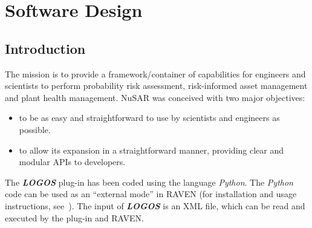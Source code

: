 \section{Software Design}
\subsection{Introduction}
The mission is to provide a framework/container of capabilities for
engineers and scientists to perform probability risk assessment,
risk-informed asset management and plant health management.
NuSAR was conceived with two major objectives:
\begin{itemize}
  \item  to be as easy and straightforward to use by scientists and engineers as possible.
  \item to allow its expansion in a straightforward manner, providing clear and modular APIs  to developers.
\end{itemize}

The \textit{\textbf{LOGOS}} plug-in has been coded using the language \emph{Python}. The \emph{Python}
code can be used as an ``external mode'' in RAVEN (for installation and usage instructions, see~\cite{RAVENuserManual}).
The input of  \textit{\textbf{LOGOS}} is an XML file, which can be read and executed by the plug-in and RAVEN.
